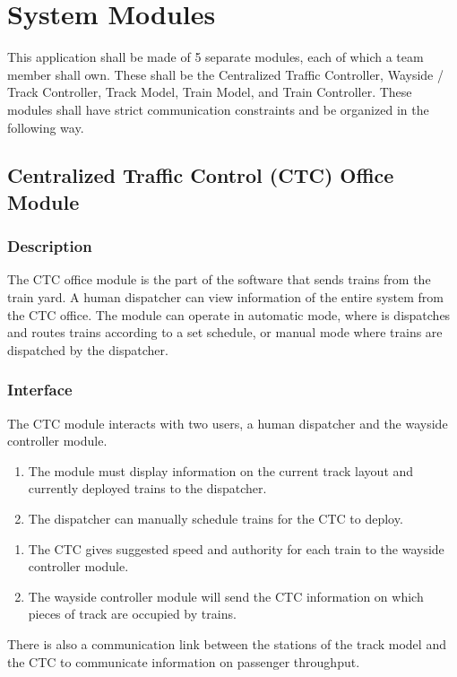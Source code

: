 \documentclass{scrreprt}
\begin{document}


\chapter{System Modules}
This application shall be made of 5 separate modules, each of which a team member shall own.
These shall be the Centralized Traffic Controller, Wayside / Track Controller, Track Model, Train Model, and Train Controller.
These modules shall have strict communication constraints and be organized in the following way.

\section{Centralized Traffic Control (CTC) Office Module}

\subsection{Description}
The CTC office module is the part of the software that sends trains from the
train yard. A human dispatcher can view information of the entire system
from the CTC office. The module can operate in automatic mode, where is dispatches
and routes trains according to a set schedule, or manual mode where trains are
dispatched by the dispatcher.

\subsection{Interface}
The CTC module interacts with two users, a human dispatcher and the wayside controller
module.
\begin{enumerate}
    \item The module must display information on the current track layout and currently
    deployed trains to the dispatcher.
    \item The dispatcher can manually schedule trains for the CTC to deploy.
\end{enumerate}
\begin{enumerate}
    \item The CTC gives suggested speed and authority for each train to the wayside
    controller module.
    \item The wayside controller module will send the CTC information on which pieces of
    track are occupied by trains.
\end{enumerate}
There is also a communication link between the stations of the track model and the
CTC to communicate information on passenger throughput.
\end{document}

